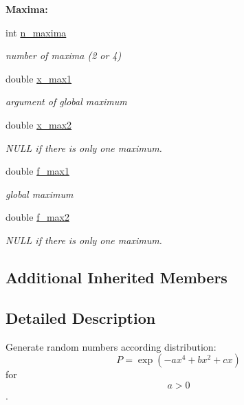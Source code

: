 \begin{Indent}{\bf Maxima\+:}\par
\begin{DoxyCompactItemize}
\item 
int \hyperlink{class_p_c_a_1_1_double_well_rand_ae53977982288d0b187a7fab536bbc55b}{n\+\_\+maxima}
\begin{DoxyCompactList}\small\item\em number of maxima (2 or 4) \end{DoxyCompactList}\item 
double \hyperlink{class_p_c_a_1_1_double_well_rand_a69b543f7eb8dda81f522a2002af65456}{x\+\_\+max1}
\begin{DoxyCompactList}\small\item\em argument of global maximum \end{DoxyCompactList}\item 
double \hyperlink{class_p_c_a_1_1_double_well_rand_a2fd3ef155f258ef1393fdb5ae503e2b0}{x\+\_\+max2}
\begin{DoxyCompactList}\small\item\em N\+U\+LL if there is only one maximum. \end{DoxyCompactList}\item 
double \hyperlink{class_p_c_a_1_1_double_well_rand_a627173c860baf5c9744916fc9e203404}{f\+\_\+max1}
\begin{DoxyCompactList}\small\item\em global maximum \end{DoxyCompactList}\item 
double \hyperlink{class_p_c_a_1_1_double_well_rand_a05278693e04d00a31bd41dedb38926b7}{f\+\_\+max2}
\begin{DoxyCompactList}\small\item\em N\+U\+LL if there is only one maximum. \end{DoxyCompactList}\end{DoxyCompactItemize}
\end{Indent}
\subsection*{Additional Inherited Members}


\subsection{Detailed Description}
Generate random numbers according distribution\+: \[ P = \exp(-ax^4+bx^2+cx) \] for \[ a>0 \]. 

